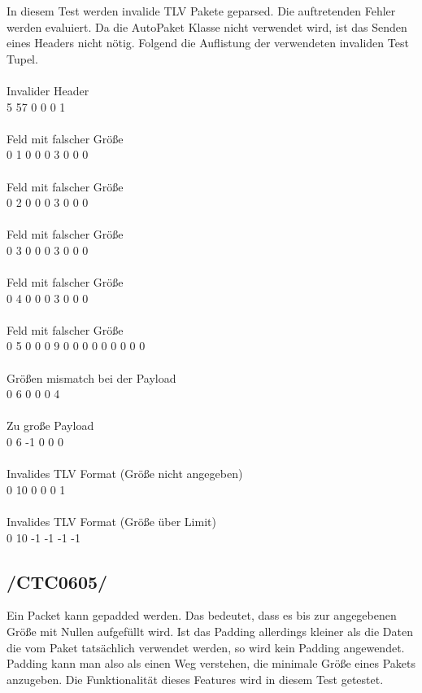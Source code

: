 In diesem Test werden invalide TLV Pakete geparsed. Die auftretenden Fehler werden evaluiert.
Da die AutoPaket Klasse nicht verwendet wird, ist das Senden eines Headers nicht nötig.
Folgend die Auflistung der verwendeten invaliden Test Tupel.\\\\
Invalider Header\\
5 57 0 0 0 1\\\\
Feld mit falscher Größe\\
0 1 0 0 0 3 0 0 0 \\\\
Feld mit falscher Größe\\
0 2 0 0 0 3 0 0 0 \\\\    
Feld mit falscher Größe\\
0 3 0 0 0 3 0 0 0\\\\    
Feld mit falscher Größe\\
0 4 0 0 0 3 0 0 0\\\\    
Feld mit falscher Größe\\
0 5 0 0 0 9 0 0 0 0 0 0 0 0 0 \\\\    
Größen mismatch bei der Payload\\
0 6 0 0 0 4\\\\
Zu große Payload \\
0 6 -1 0 0 0  \\\\
Invalides TLV Format (Größe nicht angegeben) \\
0 10 0 0 0 1 \\\\
Invalides TLV Format (Größe über Limit) \\
0 10 -1 -1 -1 -1\\

\subsection{/CTC0605/} 
Ein Packet kann gepadded werden. Das bedeutet, dass es bis zur angegebenen Größe mit Nullen aufgefüllt wird.
Ist das Padding allerdings kleiner als die Daten die vom Paket tatsächlich verwendet werden, so wird 
kein Padding angewendet. Padding kann man also als einen Weg verstehen, die minimale Größe eines Pakets 
anzugeben. Die Funktionalität dieses Features wird in diesem Test getestet.

